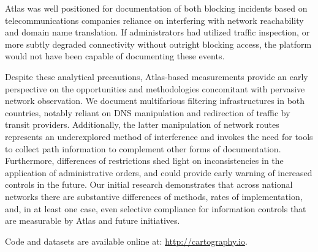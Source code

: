 Atlas was well positioned for documentation of both blocking incidents based on telecommunications companies reliance on interfering with network reachability and domain name translation. If administrators had utilized traffic inspection, or more subtly degraded connectivity without outright blocking access, the platform would not have been capable of documenting these events.

Despite these analytical precautions, Atlas-based measurements provide an early perspective on the opportunities and methodologies concomitant with pervasive network observation. We document multifarious filtering infrastructures in both countries, notably reliant on DNS manipulation and redirection of traffic by transit providers. Additionally, the latter manipulation of network routes represents an underexplored method of interference and invokes the need for tools to collect path information to complement other forms of documentation. Furthermore, differences of restrictions shed light on  inconsistencies in the application of administrative orders, and could provide early warning of increased controls in the future. Our initial research demonstrates that across national networks there are substantive differences of methods, rates of implementation, and, in at least one case, even selective compliance for information controls that are measurable by Atlas and future initiatives.

Code and datasets are available online at: \url{http://cartography.io}.
